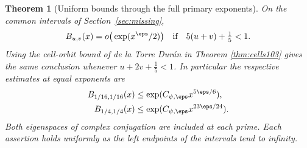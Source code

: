 \documentclass[a4paper,11pt]{article}
\newtheorem{theorem}[proposition]{Theorem}
\theoremstyle{definition}
\theoremstyle{remark}
\numberwithin{equation}{section}
\begin{document}
\begin{theorem}[Uniform bounds through the full primary exponents]
\label{thm:tower104}
On the common intervals of Section~\ref{sec:missing},
\[
 B_{u,v}(x)=o\big(\exp(x^\eps/2)\big)
 \quad\text{if}\quad 5(u+v)+\tfrac15<1 .
\]
Using the cell-orbit bound of de la Torre Dur\'an in
Theorem \ref{thm:cells103}
gives the same conclusion whenever \(u+2v+\tfrac15<1\).
In particular the respective estimates at equal exponents are
\begin{align}
 B_{1/16,1/16}(x)&\le\exp(C_{\psi,\eps}x^{5\eps/6}),
                                                     \label{eq:pub104}\\
 B_{1/4,1/4}(x)&\le\exp(C_{\psi,\eps}x^{23\eps/24}).
                                                     \label{eq:vor104}
\end{align}
Both eigenspaces of complex conjugation are included at each
prime. Each assertion holds uniformly as the left endpoints of
the intervals tend to infinity.
\end{theorem}
\end{document}
